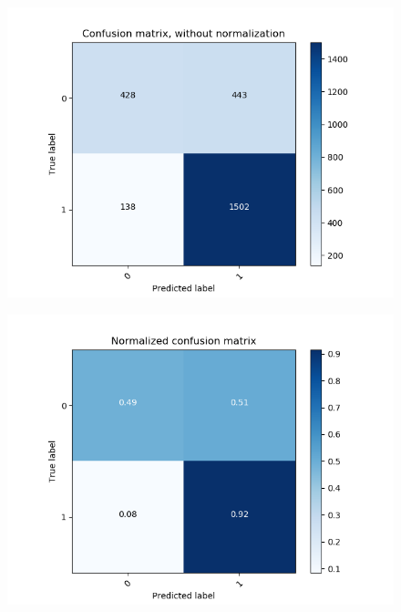 \begin{figure}[H]
	\centering
	\begin{minipage}[b]{0.45\columnwidth}
		\centering
		\includegraphics[clip, width=\linewidth]{fig/chapter4/3d/confusion_matrix/count_confusion_matrix_False_10_gru}
		\label{fig:count_10}
	\end{minipage}
	\begin{minipage}[b]{0.45\columnwidth}
		\centering
		\includegraphics[clip, width=\linewidth]{fig/chapter4/3d/confusion_matrix/normalized_confusion_matrix_False_10_gru}
		\label{fig: depth10}
	\end{minipage}
	\begin{minipage}[b]{0.45\columnwidth}

\end{minipage}
\end{figure}
